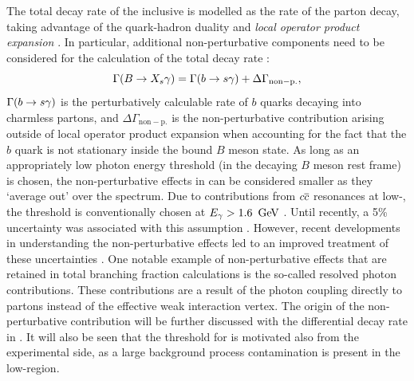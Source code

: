 The total decay rate of the inclusive \BtoXsgamma is modelled as the rate of the parton decay, 
taking advantage of the quark-hadron duality and \textit{local operator product expansion} \cite{Peskin:1995ev,Buchalla:1995vs,Buras:1998raa}.
In particular, additional non-perturbative components need to be considered for the \SM calculation of the total decay rate \cite{Misiak:2015xwa}:
\begin{equation}\label{eq:btosgammarate_nonp}
    \Gamma(B\rightarrow X_s\gamma) = \Gamma(b\rightarrow s\gamma) + \Delta\Gamma_{\mathrm{non-p.}},
\end{equation}
$\Gamma(b\rightarrow s\gamma)$ is the perturbatively calculable rate of $b$ quarks decaying into charmless partons, 
and $\Delta\Gamma_{\mathrm{non-p.}}$ is the non-perturbative contribution arising outside of local operator product expansion when accounting for the fact that the $b$ quark is not stationary inside the bound $B$ meson state.
As long as an appropriately low photon energy threshold (in the decaying $B$ meson rest frame) is chosen, the non-perturbative effects in  can be considered smaller as they `average out' over the spectrum.
Due to contributions from $c\overline c$ resonances at low-\Egamma, the threshold is conventionally chosen at ${E_{\gamma}}>1.6~\mathrm{\,Ge\kern -0.1em V}$ \cite{Misiak:2009nr}.
Until recently, a 5\% uncertainty was associated with this assumption \cite{Benzke:2010js}. 
However, recent developments in understanding the non-perturbative effects \cite{Gunawardana:2019gep} led to an improved treatment of these uncertainties \cite{Misiak:2020vlo}.
One notable example of non-perturbative effects that are retained in total branching fraction calculations is the so-called resolved photon contributions.
These contributions are a result of the photon coupling directly to partons instead of the effective weak interaction vertex.
The origin of the non-perturbative contribution will be further discussed with the differential decay rate in .
It will also be seen that the threshold for \Egamma is motivated also from the experimental side, as a large background process contamination is present in the low-\Egamma region.

